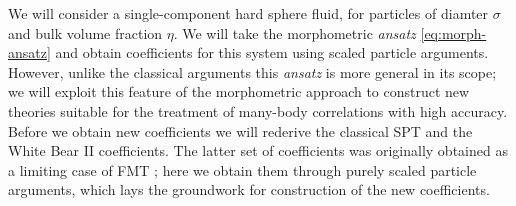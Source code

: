 \documentclass[11pt,twoside]{report}
\begin{document}
We will consider a single-component hard sphere fluid, for particles of diamter $\sigma$ and bulk volume fraction $\eta$.
We will take the morphometric \emph{ansatz} \eqref{eq:morph-ansatz} and obtain coefficients for this system using scaled particle arguments.
However, unlike the classical arguments this \emph{ansatz} is more general in its scope; we will exploit this feature of the morphometric approach to construct new theories suitable for the treatment of many-body correlations with high accuracy.
Before we obtain new coefficients we will rederive the classical SPT and the White Bear II coefficients.
The latter set of coefficients was originally obtained as a limiting case of FMT \cite{Hansen-GoosJPCM2006}; here we obtain them through purely scaled particle arguments, which lays the groundwork for construction of the new coefficients.
\end{document}
